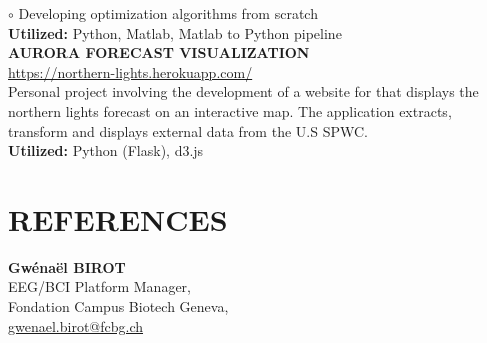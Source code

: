 \documentclass[]{cv-style}
\begin{document}
    $\circ$ Developing optimization algorithms from scratch\\
\textbf{Utilized:} Python, Matlab, Matlab to Python pipeline
\\[0.4cm]
\textbf{AURORA FORECAST VISUALIZATION}\\
\url{https://northern-lights.herokuapp.com/}\\
    Personal project involving the development of a website for that displays
    the northern lights forecast on an interactive map. The application 
    extracts, transform and displays external data from the U.S SPWC.\\
\textbf{Utilized:} Python (Flask), d3.js
\\[0.4cm]
\section{REFERENCES}
    \textbf{Gwénaël BIROT} \\
    EEG/BCI Platform Manager, \\
    Fondation Campus Biotech Geneva,\\
    \url{gwenael.birot@fcbg.ch}
\end{document}

